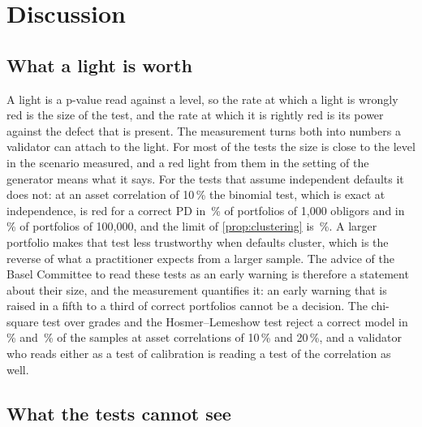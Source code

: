 \section{Discussion}
\label{sec:discussion}

\subsection{What a light is worth}
\label{sec:di-lights}

A light is a p-value read against a level, so the rate at which a light is wrongly red is the size of the test, and the rate at which it is rightly red is its power against the defect that is present.
The measurement turns both into numbers a validator can attach to the light.
For most of the \nTests{} tests the size is close to the level in the scenario measured, and a red light from them in the setting of the generator means what it says.
For the tests that assume independent defaults it does not: at an asset correlation of 10\,\% the binomial test, which is exact at independence, is red for a correct PD in \binRhoOneZeroExact\,\% of portfolios of 1,000 obligors and in \binNRhoTenHundredK\,\% of portfolios of 100,000, and the limit of \cref{prop:clustering} is \binLimitRhoTen\,\%.
A larger portfolio makes that test less trustworthy when defaults cluster, which is the reverse of what a practitioner expects from a larger sample.
The advice of the Basel Committee to read these tests as an early warning \citep{bcbswp14} is therefore a statement about their size, and the measurement quantifies it: an early warning that is raised in a fifth to a third of correct portfolios cannot be a decision.
The chi-square test over grades and the Hosmer--Lemeshow test reject a correct model in \chiRhoOneZero\,\% and \hlRhoTwoZero\,\% of the samples at asset correlations of 10\,\% and 20\,\%, and a validator who reads either as a test of calibration is reading a test of the correlation as well.

\subsection{What the tests cannot see}
\label{sec:di-blind}

